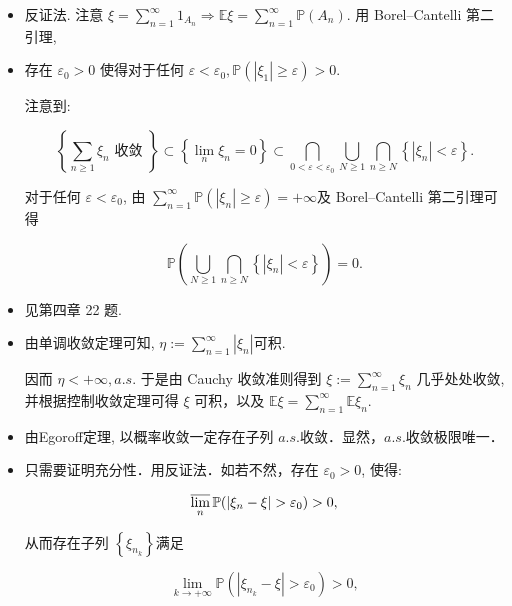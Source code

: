 \begin{itemize}

\item[1.]
反证法.
注意  $\xi=\sum_{n=1}^{\infty} 1_{A_{n}} \Rightarrow \mathbb{E} \xi=\sum_{n=1}^{\infty} \mathbb{P}\left(A_{n}\right)$.
用 Borel--Cantelli 第二引理,

\item[2.]

存在  $\varepsilon_{0}>0$
使得对于任何  $\varepsilon<\varepsilon_{0}, \mathbb{P}\left(\left|\xi_{1}\right| \geq \varepsilon\right)>0  $.

注意到:

$$\left\{\sum_{n \geq 1} \xi_{n} \text{ 收敛 }\right\} \subset\left\{\lim _{n} \xi_{n}=0\right\} \subset \bigcap_{0<\varepsilon<\varepsilon_{0}} \bigcup_{N \geq 1} \bigcap_{n \geq N}\left\{\left|\xi_{n}\right|<\varepsilon\right\} .$$

对于任何  $\varepsilon<\varepsilon_0$,
由  $\sum_{n=1}^{\infty} \mathbb{P}\left(\left|\xi_{n}\right| \geq \varepsilon\right)=+\infty$及 Borel--Cantelli 第二引理可得

$$\mathbb{P}\left(\bigcup_{N \geq 1} \bigcap_{n \geq N}\left\{\left|\xi_{n}\right|<\varepsilon\right\}\right)=0.$$

\item[3.]

见第四章 22 题.

\item[4.]

由单调收敛定理可知,  $\eta:=\sum_{n=1}^{\infty}\left|\xi_{n}\right|$可积.

因而  $\eta<+\infty , a.  s.$
于是由 Cauchy 收敛准则得到  $\xi:=\sum_{n=1}^{\infty} \xi_n$
几乎处处收敛,并根据控制收敛定理可得  $\xi$  可积，以及  $\mathbb{E} \xi=\sum_{n=1}^{\infty} \mathbb{E} \xi_{n}$.

\item[5.]

由Egoroff定理, 以概率收敛一定存在子列 $a.s.$收敛．显然，$a.  s.$收敛极限唯一．

\item[6.]

只需要证明充分性．用反证法．如若不然，存在  $\varepsilon_{0} > 0$, 使得:

$$\varlimsup_{n} \mathbb{P}(\left|\xi_{n}-\xi\right|>\varepsilon_{0})>0,$$

从而存在子列  $\left\{\xi_{n_{k}}\right\}$满足

$$\lim_{k \to +\infty} \mathbb{P}(\left|\xi_{n_{k}}-\xi\right|>\varepsilon_{0})>0,$$


\end{itemize}
